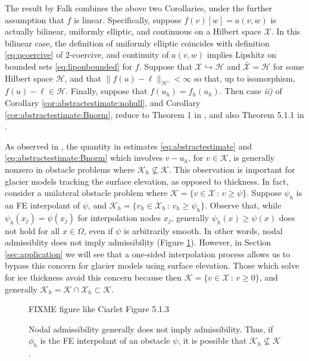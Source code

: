 \documentclass[hidelinks,onefignum,onetabnum,final]{siamart220329}  %
\newcommand{\cH}{\mathcal{H}}
\newcommand{\cK}{\mathcal{K}}
\newcommand{\cX}{\mathcal{X}}
\begin{document}
The result by Falk \cite{Falk1974} combines the above two Corollaries, under the further assumption that $f$ is linear.  Specifically, suppose $f(v)[w]=a(v,w)$ is actually bilinear, uniformly elliptic, and continuous on a Hilbert space $\cX$.  In this bilinear case, the definition of uniformly elliptic coincides with definition \eqref{eq:qcoercive} of $2$-coercive, and continuity of $a(v,w)$ implies Lipshitz on bounded sets \eqref{eq:liponbounded} for $f$.  Suppose that $\cX\hookrightarrow \cH$ and $\bar{\cX} = \cH$ for some Hilbert space $\cH$, and that $\|f(u)-\ell\|_{\cH'} < \infty$ so that, up to isomorphism, $f(u)-\ell \in \cH$.  Finally, suppose that $f(u_h)=f_h(u_h)$.  Then case \emph{ii)} of Corollary \ref{cor:abstractestimate:nohull}, and Corollary \ref{cor:abstractestimate:Bnorm}, reduce to Theorem 1 in \cite{Falk1974}, and also Theorem 5.1.1 in \cite{Ciarlet2002}.

As observed in \cite{Ciarlet2002}, the quantity in estimates \eqref{eq:abstractestimate} and \eqref{eq:abstractestimate:Bnorm} which involves $v-u_h$, for $v\in\cK$, is generally nonzero in obstacle problems where $\cK_h \nsubseteq \cK$.  This observation is important for glacier models tracking the surface elevation, as opposed to thickness.  In fact, consider a unilateral obstacle problem where $\cK=\{v \in \cX\,:\,v\ge \psi\}$.  Suppose $\psi_h$ is an FE interpolant of $\psi$, and $\cK_h=\{v_h \in \cX_h\,:\,v_h\ge \psi_h\}$.  Observe that, while $\psi_h(x_j)=\psi(x_j)$ for interpolation nodes $x_j$, generally $\psi_h(x) \ge \psi(x)$ does not hold for all $x\in\Omega$, even if $\psi$ is arbitrarily smooth.  In other words, nodal admissiblity does not imply admissibility (Figure \ref{fig:nonadmissible}).  However, in Section \ref{sec:application} we will see that a one-sided interpolation process allows us to bypass this concern for glacier models using surface elevation.  Those which solve for ice thickness avoid this concern because then $\cK = \{v\in\cX\,:\,v\ge 0\}$, and generally $\cK_h=\cK\cap\cX_h \subset \cK$.

\begin{figure}
\begin{center}
FIXME figure like Ciarlet Figure 5.1.3 %
\end{center}
\caption{Nodal admissibility generally does not imply admissibility.  Thus, if $\phi_h$ is the FE interpolant of an obstacle $\psi$, it is possible that $\cK_h \nsubseteq \cK$.}
\label{fig:nonadmissible}
\end{figure}
\end{document}
